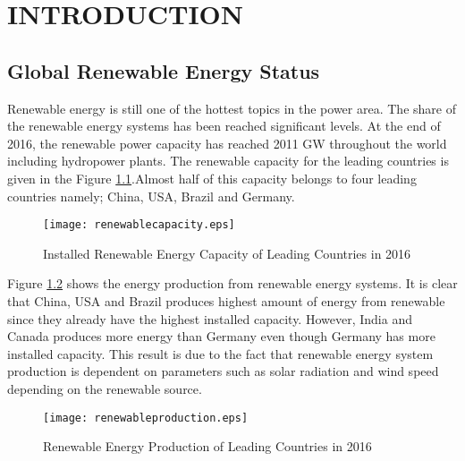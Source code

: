 \chapter{INTRODUCTION}
\label{chp:1}

\section{Global Renewable Energy Status}
Renewable energy is still one of the hottest topics in the power area. The share of the renewable energy systems has been reached significant levels. At the end of 2016, the renewable power capacity has reached 2011 GW throughout the world including hydropower plants.\cite{InternationalRenewableEnergyAgency2017}  The renewable capacity for the leading countries is given in the Figure \ref{renewablecap}.Almost half of this capacity belongs to four leading countries namely; China, USA, Brazil and Germany.
\begin{figure}[h!]
	\centering
	\texttt{[image: renewablecapacity.eps]}
	\caption{Installed Renewable Energy Capacity of Leading Countries in 2016\cite{InternationalRenewableEnergyAgency2017}}
	\label{renewablecap}
\end{figure}
Figure \ref{renewablepro} shows the energy production from renewable energy systems. It is clear that China, USA and Brazil produces highest amount of energy from renewable since they already have the highest installed capacity. However, India and Canada produces more energy than Germany even though Germany has more installed capacity. This result is due to the fact that renewable energy system production is dependent on parameters such as solar radiation and wind speed depending on the renewable source.
\begin{figure}[h!]
	\centering
	\texttt{[image: renewableproduction.eps]}
	\caption{Renewable Energy Production of Leading Countries in 2016 \cite{InternationalRenewableEnergyAgency2017}}
	\label{renewablepro}
\end{figure}



